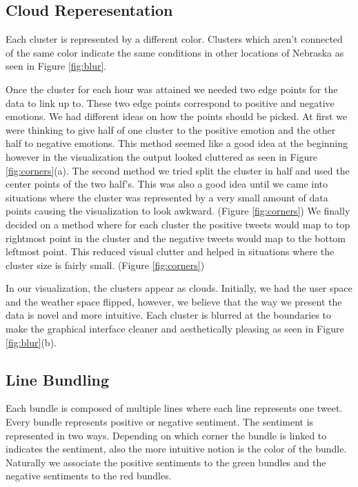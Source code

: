 \subsection{Cloud Reperesentation}
Each cluster is represented by a different color. Clusters which aren't connected of the same color indicate the same conditions in other locations of Nebraska as seen in Figure \ref{fig:blur}.

Once the cluster for each hour was attained we needed two edge points for the data to link up to. These two edge points correspond to positive and negative emotions. We had different ideas on how the points should be picked. At first we were thinking to give half of one cluster to the positive emotion and the other half to negative emotions. This method seemed like a good idea at the beginning however in the visualization the output looked cluttered as seen in Figure \ref{fig:corners}(a). The second method we tried split the cluster in half and used the center points of the two half's. This was also a good idea until we came into situations where the cluster was represented by a very small amount of data points causing the visualization to look awkward. (Figure \ref{fig:corners}) We finally decided on a method where for each cluster the positive tweets would map to top rightmost point in the cluster and the negative tweets would map to the bottom leftmost point. This reduced visual clutter and helped in situations where the cluster size is fairly small. (Figure \ref{fig:corners})

In our visualization, the clusters appear as clouds. Initially, we had the user space and the weather space flipped, however, we believe that the way we present the data is novel and more intuitive. Each cluster is blurred at the boundaries to make the graphical interface cleaner and aesthetically pleasing as seen in Figure \ref{fig:blur}(b).




\begin{figure*}[htp]
  \centering
  \quad
  \quad
\caption{Determining the best position for indicating negative and positive tweets in the cloud clusters.}
\label{fig:corners}
\end{figure*}

\subsection{Line Bundling}
Each bundle is composed of multiple lines where each line represents one tweet. Every bundle represents positive or negative sentiment. The sentiment is represented in two ways. Depending on which corner the bundle is linked to indicates the sentiment, also the more intuitive notion is the color of the bundle. Naturally we associate the positive sentiments to the green bundles and the negative sentiments to the red bundles.

